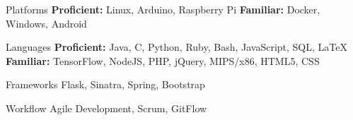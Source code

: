 
\vspace{0mm}
\begin{cvskills}

  \vspace{0mm}


  \cvskill
    {Platforms} %
    {\textbf{Proficient:} Linux, Arduino, Raspberry Pi \newline \textbf{Familiar:} Docker, Windows, Android} %

  \vspace{0mm}
  
  \cvskill
    {Languages} %
    {\textbf{Proficient:} Java, C, Python, Ruby, Bash, JavaScript, SQL, LaTeX \newline \textbf{Familiar:} TensorFlow, NodeJS, PHP, jQuery, MIPS/x86, HTML5, CSS} %

  \vspace{0mm}

  \cvskill
    {Frameworks} %
    {Flask, Sinatra, Spring, Bootstrap} %

  \vspace{0mm}

  \cvskill
    {Workflow} %
    {Agile Development, Scrum, GitFlow} %

\end{cvskills}